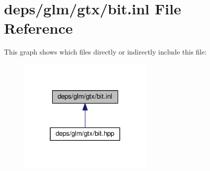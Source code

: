 \hypertarget{bit_8inl}{}\section{deps/glm/gtx/bit.inl File Reference}
\label{bit_8inl}
This graph shows which files directly or indirectly include this file\+:
\nopagebreak
\begin{figure}[H]
\begin{center}
\leavevmode
\includegraphics[width=185pt]{dd/dca/bit_8inl__dep__incl}
\end{center}
\end{figure}
